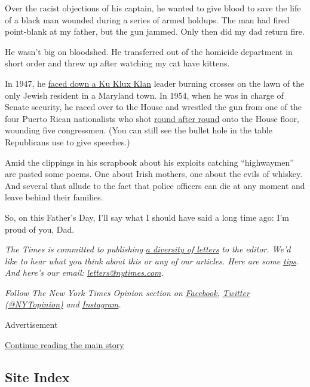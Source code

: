 Over the racist objections of his captain, he wanted to give blood to
save the life of a black man wounded during a series of armed holdups.
The man had fired point-blank at my father, but the gun jammed. Only
then did my dad return fire.

He wasn't big on bloodshed. He transferred out of the homicide
department in short order and threw up after watching my cat have
kittens.

In 1947, he
\href{https://www.nytimes.com/2017/08/19/opinion/sunday/trump-neo-nazis-and-the-klan.html}{faced
down a Ku Klux Klan} leader burning crosses on the lawn of the only
Jewish resident in a Maryland town. In 1954, when he was in charge of
Senate security, he raced over to the House and wrestled the gun from
one of the four Puerto Rican nationalists who shot
\href{https://timesmachine.nytimes.com/timesmachine/1954/03/02/issue.html}{round
after round} onto the House floor, wounding five congressmen. (You can
still see the bullet hole in the table Republicans use to give
speeches.)

Amid the clippings in his scrapbook about his exploits catching
``highwaymen'' are pasted some poems. One about Irish mothers, one about
the evils of whiskey. And several that allude to the fact that police
officers can die at any moment and leave behind their families.

So, on this Father's Day, I'll say what I should have said a long time
ago: I'm proud of you, Dad.

\emph{The Times is committed to publishing}
\href{https://www.nytimes.com/2019/01/31/opinion/letters/letters-to-editor-new-york-times-women.html}{\emph{a
diversity of letters}} \emph{to the editor. We'd like to hear what you
think about this or any of our articles. Here are some}
\href{https://help.nytimes.com/hc/en-us/articles/115014925288-How-to-submit-a-letter-to-the-editor}{\emph{tips}}\emph{.
And here's our email:}
\href{mailto:letters@nytimes.com}{\emph{letters@nytimes.com}}\emph{.}

\emph{Follow The New York Times Opinion section on}
\href{https://www.facebook.com/nytopinion}{\emph{Facebook}}\emph{,}
\href{http://twitter.com/NYTOpinion}{\emph{Twitter (@NYTopinion)}}
\emph{and}
\href{https://www.instagram.com/nytopinion/}{\emph{Instagram}}\emph{.}

Advertisement

\protect\hyperlink{after-bottom}{Continue reading the main story}

\hypertarget{site-index}{%
\subsection{Site Index}\label{site-index}}

